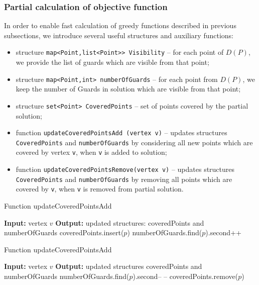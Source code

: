 \documentclass[runningheads,a4paper]{elsarticle}
\begin{document}
	\subsubsection{Partial calculation of objective function}
	
	In order to enable fast calculation of greedy functions described in previous subsections, we introduce several useful structures and auxiliary functions:
	\begin{itemize}
		\item structure \texttt{map<Point,list<Point>> Visibility} -- for each point of $D(P)$, we provide the list of guards which are visible from that point;
		\item structure \texttt{map<Point,int> numberOfGuards} -- for each point from $D(P)$,  we keep the number of Guards in solution which are visible from that point;
		\item structure \texttt{set<Point> CoveredPoints} -- set of points covered by the partial solution;
		\item function \texttt{updateCoveredPointsAdd (vertex v)} -- updates  structures \texttt{CoveredPoints} and \texttt{numberOfGuards} by considering all new points which are covered by vertex \texttt{v}, when \texttt{v} is added to solution;
		\item function \texttt{updateCoveredPointsRemove(vertex v)} -- updates  structures \texttt{CoveredPoints} and \texttt{numberOfGuards} by removing all points which are covered by \texttt{v}, when \texttt{v} is removed from partial solution.
	\end{itemize}
	\begin{algorithm}[!t]
          	\caption{Function updateCoveredPointsAdd}\label{alg:updateCoveredPointsAdd}
          	\begin{algorithmic}[1]
          		\State \textbf{Input:} vertex $v$
          		\State \textbf{Output:} updated structures: coveredPoints and numberOfGuards
          		\State coveredPoints.insert($p$)
          		\State numberOfGuards.find($p$).second++
          		\EndFor
          	\end{algorithmic}
          \end{algorithm}
                    \begin{algorithm}[!t]
          	\caption{Function updateCoveredPointsAdd}\label{alg:updateCoveredPointsRemove}
          	\begin{algorithmic}[1]
          		\State \textbf{Input:} vertex $v$
          		\State \textbf{Output:} updated structures coveredPoints and numberOfGuards
          		\State numberOfGuards.find($p$).second-- --
                    \State coveredPoints.remove($p$)
                    \EndIf
          		\EndFor
          	\end{algorithmic}
          \end{algorithm}
	
\end{document}
